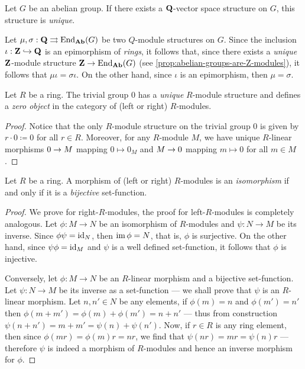 \begin{example}
\label{exp:Q-vector-space}
Let \(G\) be an abelian group. If there exists a \(\mathbf{Q}\)-vector
space structure on \(G\), this structure is \emph{unique}.

Let \(\mu, \sigma: \mathbf{Q} \rightrightarrows \operatorname{End}_{{\textbf{Ab}}}(G)\) be two \(Q\)-module structures on
\(G\). Since the inclusion \(\iota: \mathbf{Z} \hookrightarrow \mathbf{Q}\) is an epimorphism of
\emph{rings}, it follows that, since there exists a \emph{unique} \(\mathbf{Z}\)-module
structure \(\mathbf{Z} \to \operatorname{End}_{{\textbf{Ab}}}(G)\) (see
\cref{prop:abelian-groups-are-Z-modules}), it follows that
\(\mu \iota = \sigma \iota\). On the other hand, since \(\iota\) is an
epimorphism, then \(\mu = \sigma\).
\end{example}

\begin{proposition}
\label{prop:zero-object-in-R-Mod}
Let \(R\) be a ring. The trivial group \(0\) has a \emph{unique} \(R\)-module
structure and defines a \emph{zero object} in the category of (left or right)
\(R\)-modules.
\end{proposition}

\begin{proof}
Notice that the only \(R\)-module structure on the trivial group \(0\) is given
by \(r \cdot 0 \coloneq 0\) for all \(r \in R\). Moreover, for any \(R\)-module
\(M\), we have unique \(R\)-linear morphisms \(0 \to M\) mapping
\(0 \mapsto 0_M\) and \(M \to 0\) mapping \(m \mapsto 0\) for all
\(m \in M\).
\end{proof}

\begin{proposition}[Isomorphisms]
\label{prop:R-mod-iso-iff-bij}
Let \(R\) be a ring. A morphism of (left or right) \(R\)-modules is an
\emph{isomorphism} if and only if it is a \emph{bijective} set-function.
\end{proposition}

\begin{proof}
We prove for right-\(R\)-modules, the proof for left-\(R\)-modules is completely
analogous. Let \(\phi: M \to N\) be an isomorphism of \(R\)-modules and
\(\psi: N \to M\) be its inverse. Since \(\phi \psi = \operatorname{id}_N\), then
\(\operatorname{im} \phi = N\), that is, \(\phi\) is surjective. On the other hand, since
\(\psi \phi = \operatorname{id}_M\) and \(\psi\) is a well defined set-function, it follows
that \(\phi\) is injective.

Conversely, let \(\phi: M \to N\) be an \(R\)-linear morphism and a bijective
set-function. Let \(\psi: N \to M\) be its inverse as a set-function --- we
shall prove that \(\psi\) is an \(R\)-linear morphism. Let \(n, n' \in N\) be any
elements, if \(\phi(m) = n\) and \(\phi(m') = n'\) then
\(\phi(m + m') = \phi(m) + \phi(m') = n + n'\) --- thus from construction
\(\psi(n + n') = m + m' = \psi(n) + \psi(n')\). Now, if \(r \in R\) is any ring
element, then since \(\phi(m r) = \phi(m) r = n r\), we find that
\(\psi(n r) = m r = \psi(n) r\) --- therefore \(\psi\) is indeed a morphism of
\(R\)-modules and hence an inverse morphism for \(\phi\).
\end{proof}

